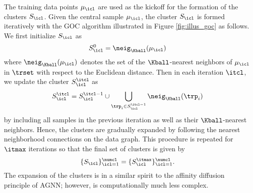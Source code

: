 \documentclass[journal]{IEEEtran}
\begin{document}

The training data points $ \mu_\icl$ are used as the kickoff for the formation of the clusters $S_\icl$. Given the central sample $\mu_\icl$, the cluster $S_\icl$ is formed iteratively with the GOC algorithm illustrated in Figure \ref{fig:illus_goc} as follows. We first initialize $S_\icl$ as
%
\begin{equation}
\label{eq:clus_init_goc}
S_\icl^0 = \neig_\Kball (\mu_\icl)
\end{equation}
%
where $\neig_\Kball (\mu_\icl)$ denotes the set of the $\Kball$-nearest neighbors of $\mu_\icl$ in $\trset$ with respect to the Euclidean distance. Then in each iteration $\itcl$, we update the cluster $S_\icl^\itcl$ as
%
\begin{equation}
S_\icl^\itcl =S_\icl^{\itcl-1} \cup  \bigcup_{\trp_i \in S_\icl^{\itcl-1} } \neig_\Kball (\trp_i)  
\end{equation}
%
by including all samples in the previous iteration as well as their $\Kball$-nearest neighbors. Hence, the clusters are gradually expanded by following the nearest neighborhood connections on the data graph. This procedure is repeated for $\itmax$ iterations so that the final set of clusters is given by
%
\begin{equation}
\label{eq:defn_clust_final}
\{ S_\icl \}_{\icl=1}^\numcl = \{ S_\icl^\itmax \}_{\icl=1}^\numcl .
\end{equation}
%
The expansion of the clusters is in a similar spirit to the affinity diffusion principle of AGNN; however, is computationally much less complex. 
 



\end{document}
